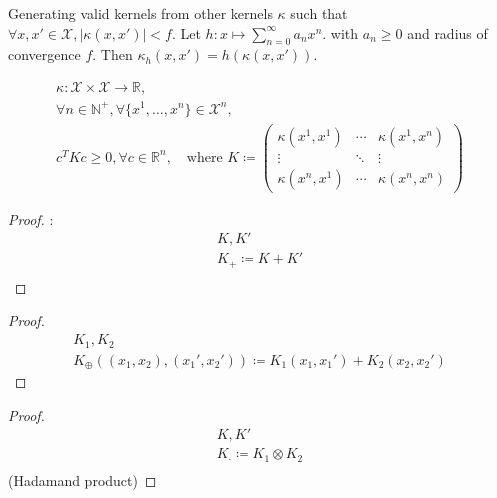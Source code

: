 \begin{theorem}[breakable]{Generating valid kernels from other kernels}{}
	$\kappa$ such that $\forall x, x' \in \mathcal X, | \kappa(x,x') | < f$.
	Let $h: x \mapsto \sum_{n=0}^\infty a_n x^n$.
	with $a_n \geq 0$ and radius of convergence $f$.
	Then $\kappa_h(x,x') = h(\kappa(x,x'))$.

	\tcblower
	\begin{align*}
		\kappa : \mathcal X \times \mathcal X \to \mathbb R,                      \\
		\forall n \in \mathds N^+, \forall \{x^1, \ldots, x^n\} \in \mathcal X^n, \\
		c^TKc \geq 0, \forall c \in \mathbb R^n, \quad \text{where } K \coloneqq \begin{pmatrix}
			                                                                         \kappa(x^1, x^1) & \cdots & \kappa(x^1, x^n) \\
			                                                                         \vdots           & \ddots & \vdots           \\
			                                                                         \kappa(x^n, x^1) & \cdots & \kappa(x^n, x^n)
		                                                                         \end{pmatrix}
	\end{align*}

	\begin{proof}:
		\begin{align*}
			K, K'                \\
			K_+ \coloneqq K + K' \\
		\end{align*}
	\end{proof}

	\begin{proof}
		\begin{align*}
			K_1, K_2 \\
			K_\oplus\left(
			(x_1,x_2), (x_1',x_2')
			\right) \coloneqq K_1(x_1,x_1') + K_2(x_2,x_2')
		\end{align*}
	\end{proof}

	\begin{proof}
		\begin{align*}
			K, K'                             \\
			K_\cdot \coloneqq K_1 \otimes K_2 \\
		\end{align*}
		(Hadamand product)


\end{proof}
\end{theorem}
